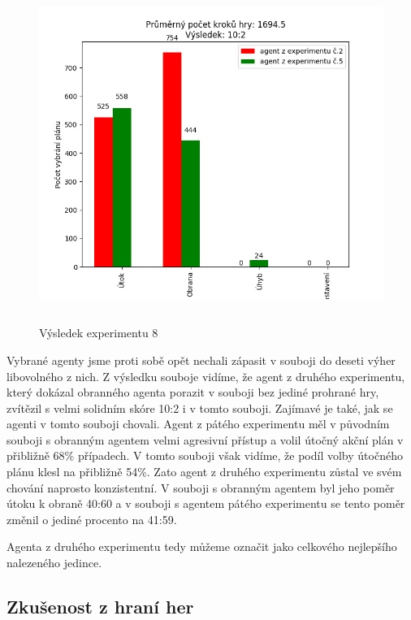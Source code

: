 \begin{figure}[H]\centering
\includegraphics[width=145mm, height=110mm]{./Obrazky/Experiment08Results.png}
\caption{Výsledek experimentu 8}
\label{Výsledek experimentu 08}
\end{figure}

Vybrané agenty jsme proti sobě opět nechali zápasit v souboji do deseti výher libovolného z nich.
Z výsledku souboje vidíme, že agent z druhého experimentu, který dokázal obranného agenta porazit v souboji bez jediné prohrané hry, zvítězil s velmi solidním skóre 10:2 i v tomto souboji.
Zajímavé je také, jak se agenti v tomto souboji chovali.
Agent z pátého experimentu měl v původním souboji s obranným agentem velmi agresivní přístup a volil útočný akční plán v přibližně 68\% případech.
V tomto souboji však vidíme, že podíl volby útočného plánu klesl na přibližně 54\%.
Zato agent z druhého experimentu zůstal ve svém chování naprosto konzistentní. V souboji s obranným agentem byl jeho poměr útoku k obraně 40:60 a v souboji s agentem pátého experimentu se tento poměr změnil o jediné procento na 41:59.
\par
Agenta z druhého experimentu tedy můžeme označit jako celkového nejlepšího nalezeného jedince.

\subsection{Zkušenost z hraní her}
